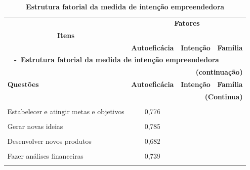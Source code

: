 \begin{center}

\begin{longtable}{p{6cm} c c c }

\caption{\textbf{Estrutura fatorial da medida de intenção empreendedora}}

\label{tabela_3} \\ \hline\hline



 
\multicolumn{1}{p{6cm}}{} & \multicolumn{3}{c}{\textbf{Fatores}}\\ 
 \multicolumn{1}{c}{\textbf{Itens}} & \multicolumn{3}{c}{\hrulefill}\\ 

 \multicolumn{1}{c}{} 
 &\multicolumn{1}{p{1.5cm}}{\textbf{Autoeficácia}} & \multicolumn{1}{p{1.5cm}}{\textbf{Intenção}} &\multicolumn{1}{p{1.5cm}}{\textbf{Família}}  
\\ \hline 

\endfirsthead


\multicolumn{4}{l}{{{\bfseries \tablename \ \thetable{} -\ \textbf{Estrutura fatorial da medida de intenção empreendedora}}}}\\
\multicolumn{4}{r}{\bfseries \textbf{(continuação)}}\\

\hline \multicolumn{1}{p{6cm}}{\textbf{Questões}} &\multicolumn{1}{c}{\textbf{Autoeficácia}} & \multicolumn{1}{c}{\textbf{Intenção}} &\multicolumn{1}{c}{\textbf{Família}}  
\\ \hline 

\endhead

\hline \multicolumn{4}{r}{\textbf{(Continua)}} \\ \hline


\endfoot
\hline \multicolumn{4}{r}{\textbf{(Conclusão)}} \\ \hline
\hline \hline

\endlastfoot


Estabelecer e atingir metas e objetivos
 &  0,776 & & \\\\
 
Gerar novas ideias
 &  0,785 & & \\\\
 
Desenvolver novos produtos
 &  0,682 & & \\\\
 
Fazer análises financeiras
 &  0,739 & & \\\\
 

\end{longtable}
\end{center}
